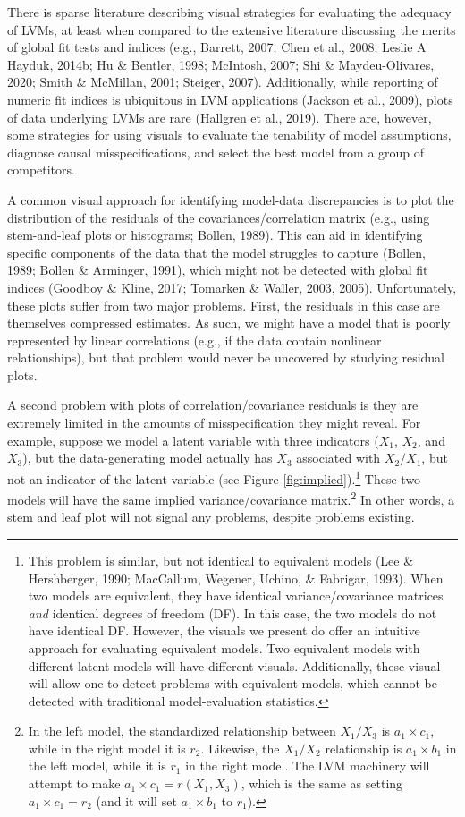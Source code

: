\documentclass[
  english,
  doc]{apa6}
\begin{document}
There is sparse literature describing visual strategies for evaluating the adequacy of LVMs, at least when compared to the extensive literature discussing the merits of global fit tests and indices (e.g., Barrett, 2007; Chen et al., 2008; Leslie A Hayduk, 2014b; Hu \& Bentler, 1998; McIntosh, 2007; Shi \& Maydeu-Olivares, 2020; Smith \& McMillan, 2001; Steiger, 2007). Additionally, while reporting of numeric fit indices is ubiquitous in LVM applications (Jackson et al., 2009), plots of data underlying LVMs are rare (Hallgren et al., 2019). There are, however, some strategies for using visuals to evaluate the tenability of model assumptions, diagnose causal misspecifications, and select the best model from a group of competitors.

A common visual approach for identifying model-data discrepancies is to plot the distribution of the residuals of the covariances/correlation matrix (e.g., using stem-and-leaf plots or histograms; Bollen, 1989). This can aid in identifying specific components of the data that the model struggles to capture (Bollen, 1989; Bollen \& Arminger, 1991), which might not be detected with global fit indices (Goodboy \& Kline, 2017; Tomarken \& Waller, 2003, 2005). Unfortunately, these plots suffer from two major problems. First, the residuals in this case are themselves compressed estimates. As such, we might have a model that is poorly represented by linear correlations (e.g., if the data contain nonlinear relationships), but that problem would never be uncovered by studying residual plots.

A second problem with plots of correlation/covariance residuals is they are extremely limited in the amounts of misspecification they might reveal. For example, suppose we model a latent variable with three indicators (\(X_1\), \(X_2\), and \(X_3\)), but the data-generating model actually has \(X_3\) associated with \(X_2/X_1\), but not an indicator of the latent variable (see Figure \ref{fig:implied}).\footnote{This problem is similar, but not identical to equivalent models (Lee \& Hershberger, 1990; MacCallum, Wegener, Uchino, \& Fabrigar, 1993). When two models are equivalent, they have identical variance/covariance matrices \emph{and} identical degrees of freedom (DF). In this case, the two models do not have identical DF. However, the visuals we present do offer an intuitive approach for evaluating equivalent models. Two equivalent models with different latent models will have different visuals. Additionally, these visual will allow one to detect problems with equivalent models, which cannot be detected with traditional model-evaluation statistics.} These two models will have the same implied variance/covariance matrix.\footnote{In the left model, the standardized relationship between \(X_1/X_3\) is \(a_1\times c_1\), while in the right model it is \(r_2\). Likewise, the \(X_1/X_2\) relationship is \(a_1\times b_1\) in the left model, while it is \(r_1\) in the right model. The LVM machinery will attempt to make \(a_1\times c_1 = r(X_1, X_3)\), which is the same as setting \(a_1\times c_1 = r_2\) (and it will set \(a_1\times b_1\) to \(r_1\)).} In other words, a stem and leaf plot will not signal any problems, despite problems existing.
\end{document}
